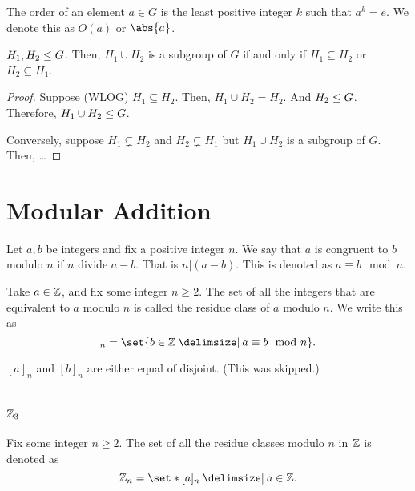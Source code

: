 \documentclass[11pt]{penrose}
\begin{document}
\begin{ndfn}
    The order of an element $a \in G$ is the least positive integer $k$ such that $a^k = e$. We denote this as $O(a)$ or $\abs{a}$.
\end{ndfn}

\begin{nthm}
    $H_1, H_2 \mathrel{\leq} G$. Then, $H_1 \cup H_2$ is a subgroup of $G$ if and only if $H_1 \subseteq H_2$ or $H_2 \subseteq H_1$.
\end{nthm}
\begin{proof}
    Suppose (WLOG) $H_1 \subseteq H_2$. Then, $H_1 \cup H_2 = H_2$. And $H_2 \mathrel{\leq} G$. Therefore, $H_1 \cup H_2 \mathrel{\leq} G$.

    Conversely, suppose $H_1 \subsetneq H_2$ and $H_2 \subsetneq H_1$ but $H_1 \cup H_2$ is a subgroup of $G$. Then, \dots
\end{proof}

\section{Modular Addition}

\begin{ndfn}
    Let $a, b$ be integers and fix a positive integer $n$. We say that $a$ is congruent to $b$ modulo $n$ if $n$ divide $a-b$. That is $n | (a-b)$. This is denoted as $a \equiv b \mod n$.
\end{ndfn}

\begin{ndfn}
    Take $a \in \mathbb{Z}$, and fix some integer $n \geq 2$. The set of all the integers that are equivalent to $a$ modulo $n$ is called the residue class of $a$ modulo $n$. We write this as
    \begin{equation}
        [a]_n = \set{b \in \Z \st a \equiv b \mod n}.
    \end{equation}
\end{ndfn}

\begin{remark}
    $[a]_n$ and $[b]_n$ are either equal of disjoint. (This was skipped.)
\end{remark}

\section{\texorpdfstring{$\mathbb{Z}_3$}{Z3}}
\begin{ndfn}
    Fix some integer $n \geq 2$. The set of all the residue classes modulo $n$ in $\mathbb{Z}$ is denoted as
    \begin{equation}
        \Z_n = \set*{[a]_n \st a \in \Z}.
    \end{equation}
\end{ndfn}
\end{document}
